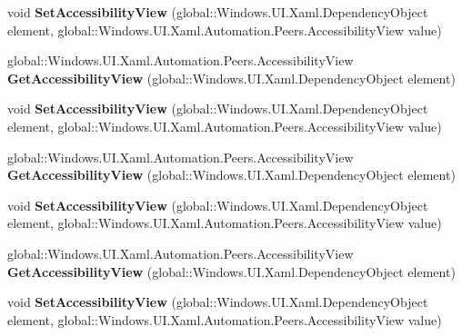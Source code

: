 \begin{DoxyCompactItemize}
void {\bfseries Set\+Accessibility\+View} (global\+::\+Windows.\+U\+I.\+Xaml.\+Dependency\+Object element, global\+::\+Windows.\+U\+I.\+Xaml.\+Automation.\+Peers.\+Accessibility\+View value)
\item 
\mbox{\label{interface_windows_1_1_u_i_1_1_xaml_1_1_automation_1_1_i_automation_properties_statics2_aab43521abb89217c9ceabc47e5d7cb7a}} 
global\+::\+Windows.\+U\+I.\+Xaml.\+Automation.\+Peers.\+Accessibility\+View {\bfseries Get\+Accessibility\+View} (global\+::\+Windows.\+U\+I.\+Xaml.\+Dependency\+Object element)
\item 
\mbox{\label{interface_windows_1_1_u_i_1_1_xaml_1_1_automation_1_1_i_automation_properties_statics2_af8ed4cb19e3b8a43bc68b0ba0231c3ae}} 
void {\bfseries Set\+Accessibility\+View} (global\+::\+Windows.\+U\+I.\+Xaml.\+Dependency\+Object element, global\+::\+Windows.\+U\+I.\+Xaml.\+Automation.\+Peers.\+Accessibility\+View value)
\item 
\mbox{\label{interface_windows_1_1_u_i_1_1_xaml_1_1_automation_1_1_i_automation_properties_statics2_aab43521abb89217c9ceabc47e5d7cb7a}} 
global\+::\+Windows.\+U\+I.\+Xaml.\+Automation.\+Peers.\+Accessibility\+View {\bfseries Get\+Accessibility\+View} (global\+::\+Windows.\+U\+I.\+Xaml.\+Dependency\+Object element)
\item 
\mbox{\label{interface_windows_1_1_u_i_1_1_xaml_1_1_automation_1_1_i_automation_properties_statics2_af8ed4cb19e3b8a43bc68b0ba0231c3ae}} 
void {\bfseries Set\+Accessibility\+View} (global\+::\+Windows.\+U\+I.\+Xaml.\+Dependency\+Object element, global\+::\+Windows.\+U\+I.\+Xaml.\+Automation.\+Peers.\+Accessibility\+View value)
\item 
\mbox{\label{interface_windows_1_1_u_i_1_1_xaml_1_1_automation_1_1_i_automation_properties_statics2_aab43521abb89217c9ceabc47e5d7cb7a}} 
global\+::\+Windows.\+U\+I.\+Xaml.\+Automation.\+Peers.\+Accessibility\+View {\bfseries Get\+Accessibility\+View} (global\+::\+Windows.\+U\+I.\+Xaml.\+Dependency\+Object element)
\item 
\mbox{\label{interface_windows_1_1_u_i_1_1_xaml_1_1_automation_1_1_i_automation_properties_statics2_af8ed4cb19e3b8a43bc68b0ba0231c3ae}} 
void {\bfseries Set\+Accessibility\+View} (global\+::\+Windows.\+U\+I.\+Xaml.\+Dependency\+Object element, global\+::\+Windows.\+U\+I.\+Xaml.\+Automation.\+Peers.\+Accessibility\+View value)
\end{DoxyCompactItemize}


